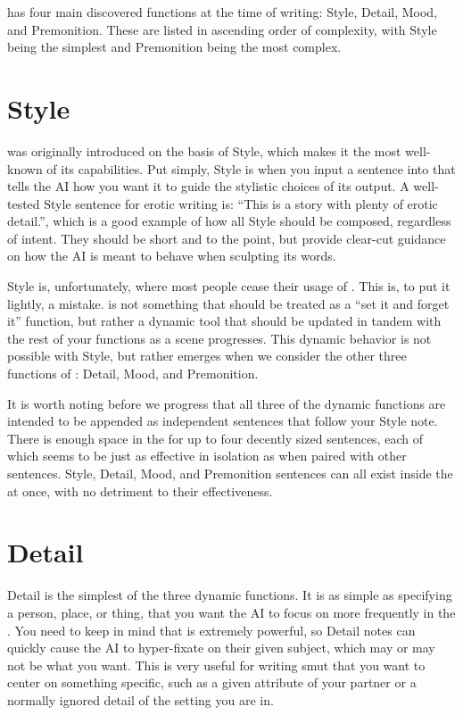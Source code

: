 \documentclass[Source-main.tex]{subfiles}
\begin{document}
\an has four main discovered functions at the time of writing: Style, Detail, Mood, and Premonition.
These are listed in ascending order of complexity, with Style being the simplest and Premonition being the most complex.

\section{Style}
\label{sec:anstyle}

\an was originally introduced on the basis of Style, which makes it the most well-known of its capabilities.
Put simply, Style is when you input a sentence into \an that tells the AI how you want it to guide the stylistic choices of its output.
A well-tested Style sentence for erotic writing is: “This is a story with plenty of erotic detail.”, which is a good example of how all Style \ans should be composed, regardless of intent.
They should be short and to the point, but provide clear-cut guidance on how the AI is meant to behave when sculpting its words.

Style is, unfortunately, where most people cease their usage of \an.
This is, to put it lightly, a mistake.
\an is not something that should be treated as a “set it and forget it” function, but rather a dynamic tool that should be updated in tandem with the rest of your functions as a scene progresses.
This dynamic behavior is not possible with Style, but rather emerges when we consider the other three functions of \an: Detail, Mood, and Premonition.

It is worth noting before we progress that all three of the dynamic functions are intended to be appended as independent sentences that follow your Style note.
There is enough space in the \an for up to four decently sized sentences, each of which seems to be just as effective in isolation as when paired with other sentences.
Style, Detail, Mood, and Premonition sentences can all exist inside the \an at once, with no detriment to their effectiveness.

\section{Detail}

Detail is the simplest of the three dynamic \an functions.
It is as simple as specifying a person, place, or thing, that you want the AI to focus on more frequently in the \an.
You need to keep in mind that \an is extremely powerful, so Detail notes can quickly cause the AI to hyper-fixate on their given subject, which may or may not be what you want.
This is very useful for writing smut that you want to center on something specific, such as a given attribute of your partner or a normally ignored detail of the setting you are in.
\end{document}

